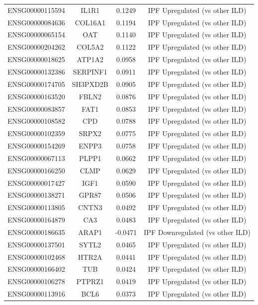 \documentclass[
]{article}
\begin{document}
\begin{singlespace}
\begin{longtable}[t]{lccc}
ENSG00000115594 & IL1R1 & 0.1249 & IPF Upregulated (vs other ILD)\\
ENSG00000084636 & COL16A1 & 0.1194 & IPF Upregulated (vs other ILD)\\
ENSG00000065154 & OAT & 0.1140 & IPF Upregulated (vs other ILD)\\
\addlinespace
ENSG00000204262 & COL5A2 & 0.1122 & IPF Upregulated (vs other ILD)\\
ENSG00000018625 & ATP1A2 & 0.0958 & IPF Upregulated (vs other ILD)\\
ENSG00000132386 & SERPINF1 & 0.0911 & IPF Upregulated (vs other ILD)\\
ENSG00000174705 & SH3PXD2B & 0.0905 & IPF Upregulated (vs other ILD)\\
ENSG00000163520 & FBLN2 & 0.0876 & IPF Upregulated (vs other ILD)\\
\addlinespace
ENSG00000083857 & FAT1 & 0.0853 & IPF Upregulated (vs other ILD)\\
ENSG00000108582 & CPD & 0.0788 & IPF Upregulated (vs other ILD)\\
ENSG00000102359 & SRPX2 & 0.0775 & IPF Upregulated (vs other ILD)\\
ENSG00000154269 & ENPP3 & 0.0758 & IPF Upregulated (vs other ILD)\\
ENSG00000067113 & PLPP1 & 0.0662 & IPF Upregulated (vs other ILD)\\
\addlinespace
ENSG00000166250 & CLMP & 0.0629 & IPF Upregulated (vs other ILD)\\
ENSG00000017427 & IGF1 & 0.0590 & IPF Upregulated (vs other ILD)\\
ENSG00000138271 & GPR87 & 0.0506 & IPF Upregulated (vs other ILD)\\
ENSG00000113805 & CNTN3 & 0.0492 & IPF Upregulated (vs other ILD)\\
ENSG00000164879 & CA3 & 0.0483 & IPF Upregulated (vs other ILD)\\
\addlinespace
ENSG00000186635 & ARAP1 & -0.0471 & IPF Downregulated (vs other ILD)\\
ENSG00000137501 & SYTL2 & 0.0465 & IPF Upregulated (vs other ILD)\\
ENSG00000102468 & HTR2A & 0.0441 & IPF Upregulated (vs other ILD)\\
ENSG00000166402 & TUB & 0.0424 & IPF Upregulated (vs other ILD)\\
ENSG00000106278 & PTPRZ1 & 0.0419 & IPF Upregulated (vs other ILD)\\
\addlinespace
ENSG00000113916 & BCL6 & 0.0373 & IPF Upregulated (vs other ILD)\\

\end{longtable}
\end{singlespace}
\end{document}

